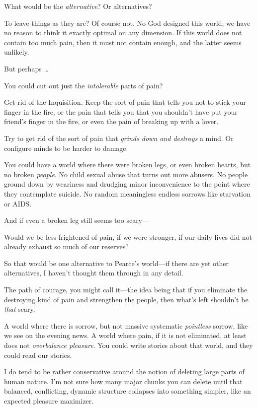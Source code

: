 {
 What would be the \textit{alternative}? Or alternatives?}

{
 To leave things as they are? Of course not. No God designed this
world; we have no reason to think it exactly optimal on any dimension.
If this world does not contain too much pain, then it must not contain
enough, and the latter seems unlikely.}

{
 But perhaps \ldots}

{
 You could cut out just the \textit{intolerable} parts of pain?}

{
 Get rid of the Inquisition. Keep the sort of pain that tells you
not to stick your finger in the fire, or the pain that tells you that
you shouldn't have put your friend's
finger in the fire, or even the pain of breaking up with a lover.}

{
 Try to get rid of the sort of pain that \textit{grinds down and
destroys} a mind. Or configure minds to be harder to damage.}

{
 You could have a world where there were broken legs, or even
broken hearts, but no broken \textit{people}. No child sexual abuse
that turns out more abusers. No people ground down by weariness and
drudging minor inconvenience to the point where they contemplate
suicide. No random meaningless endless sorrows like starvation or
AIDS.}

{
 And if even a broken leg still seems too scary---}

{
 Would we be less frightened of pain, if we were stronger, if our
daily lives did not already exhaust so much of our reserves?}

{
 So that would be one alternative to Pearce's
world---if there are yet other alternatives, I haven't
thought them through in any detail.}

{
 The path of courage, you might call it---the idea being that if
you eliminate the destroying kind of pain and strengthen the people,
then what's left shouldn't be
\textit{that} scary.}

{
 A world where there is sorrow, but not massive systematic
\textit{pointless} sorrow, like we see on the evening news. A world
where pain, if it is not eliminated, at least does not
\textit{overbalance pleasure}. You could write stories about that
world, and they could read our stories.}

{
 I do tend to be rather conservative around the notion of deleting
large parts of human nature. I'm not sure how many
major chunks you can delete until that balanced, conflicting, dynamic
structure collapses into something simpler, like an expected pleasure
maximizer.}

